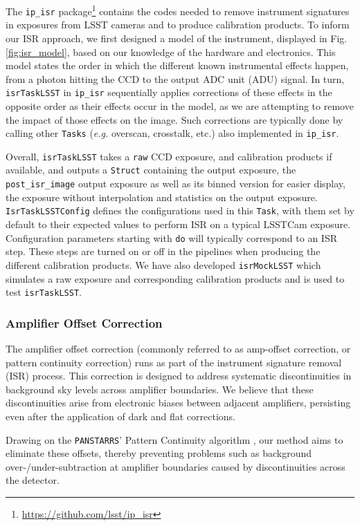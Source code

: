 The \texttt{ip\_isr} package\footnote{\url{https://github.com/lsst/ip_isr}} contains the codes needed to remove instrument signatures in exposures from LSST cameras and to produce calibration products.
To inform our ISR approach, we first designed a model of the instrument, displayed in Fig. \ref{fig:isr_model}, based on our knowledge of the hardware and electronics.
This model states the order in which the different known instrumental effects happen, from a photon hitting the CCD to the output ADC unit (ADU) signal.
In turn, \texttt{isrTaskLSST} in \texttt{ip\_isr} sequentially applies corrections of these effects in the opposite order as their effects occur in the model, as we are attempting to remove the impact of those effects on the image.
Such corrections are typically done by calling other \texttt{Tasks} (\textit{e.g.} overscan, crosstalk, etc.) also implemented in \texttt{ip\_isr}.

Overall, \texttt{isrTaskLSST} takes a \texttt{raw} CCD exposure, and calibration products if available, and outputs a \texttt{Struct} containing the output exposure, the \texttt{post\_isr\_image} output exposure as well as its binned version for easier display, the exposure without interpolation and statistics on the output exposure.
\texttt{IsrTaskLSSTConfig} defines the configurations used in this \texttt{Task}, with them set by default to their expected values to perform ISR on a typical LSSTCam exposure.
Configuration parameters starting with \texttt{do} will typically correspond to an ISR step.
These steps are turned on or off in the pipelines when producing the different calibration products.
We have also developed \texttt{isrMockLSST} which simulates a raw exposure and corresponding calibration products and is used to test \texttt{isrTaskLSST}.

\subsubsection{Amplifier Offset Correction}
\label{sec:isr:ampoffset}
The amplifier offset correction (commonly referred to as amp-offset correction, or pattern continuity correction) runs as part of the instrument signature removal (ISR) process.
This correction is designed to address systematic discontinuities in background sky levels across amplifier boundaries.
We believe that these discontinuities arise from electronic biases between adjacent amplifiers, persisting even after the application of dark and flat corrections.

Drawing on the \texttt{PANSTARRS}' Pattern Continuity algorithm \citep{2020ApJS..251....4W}, our method aims to eliminate these offsets, thereby preventing problems such as background over-/under-subtraction at amplifier boundaries caused by discontinuities across the detector.

